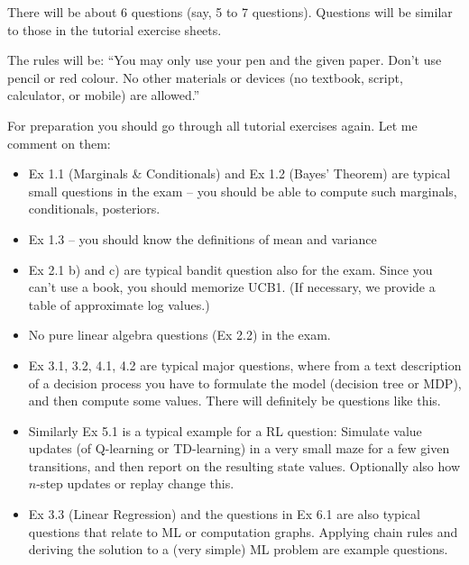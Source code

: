 

\renewcommand{\course}{Artificial Intelligence}
\renewcommand{\coursepicture}{course_ai}
\renewcommand{\coursedate}{Summer 2026}

\renewcommand{\exnum}{Exercise 7 -- Exam Preparation}

\newcommand{\BOX}[3][]{\fbox{\begin{minipage}[c]{#2}\vspace{#3}\centerline{#1}\vspace{#3}\end{minipage}}}

\exercises
{}
\exercisestitle



There will be about 6 questions (say, 5 to 7 questions). Questions will be  similar to those in the tutorial exercise sheets.

The rules will be: ``You may only use your pen and the given
paper. Don't use pencil or red colour. No other materials or devices
(no textbook, script, calculator, or mobile) are allowed.''

For preparation you should go through all tutorial exercises again. Let me comment on them:
\begin{itemize}
\item Ex 1.1 (Marginals \& Conditionals) and Ex 1.2 (Bayes' Theorem) are typical small questions in the exam -- you should be able to compute such marginals, conditionals, posteriors.
\item Ex 1.3 -- you should know the definitions of mean and variance

\item Ex 2.1 b) and c) are typical bandit question also for the exam. Since you can't use a book, you should memorize UCB1. (If necessary, we provide a table of approximate log values.)

\item No pure linear algebra questions (Ex 2.2) in the exam.

\item Ex 3.1, 3.2, 4.1, 4.2 are typical major questions, where from a text description of a decision process you have to formulate the model (decision tree or MDP), and then compute some values. There will definitely be questions like this.

\item Similarly Ex 5.1 is a typical example for a RL question: Simulate value updates (of Q-learning or TD-learning) in a very small maze for a few given transitions, and then report on the resulting state values. Optionally also how $n$-step updates or replay change this.

\item Ex 3.3 (Linear Regression) and the questions in Ex 6.1 are also typical questions that relate to ML or computation graphs. Applying chain rules and deriving the solution to a (very simple) ML problem are example questions.
\end{itemize}

